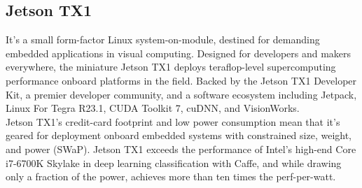     \subsection{Jetson TX1}
        It's a small form-factor Linux system-on-module, destined for demanding embedded applications in visual computing. Designed for developers and makers everywhere, the miniature Jetson TX1 deploys teraflop-level 
        supercomputing performance onboard platforms in the field. Backed by the Jetson TX1 Developer Kit, a premier developer community, and a software ecosystem including Jetpack, Linux For Tegra R23.1, CUDA Toolkit 7, 
        cuDNN, and VisionWorks. \\ 
        \vspace{3mm}
        Jetson TX1’s credit-card footprint and low power consumption mean that it’s geared for deployment onboard embedded systems with constrained size, weight, and power (SWaP). Jetson TX1 exceeds the performance of 
        Intel’s high-end Core i7-6700K Skylake in deep learning classification with Caffe, and while drawing only a fraction of the power, achieves more than ten times the perf-per-watt.
